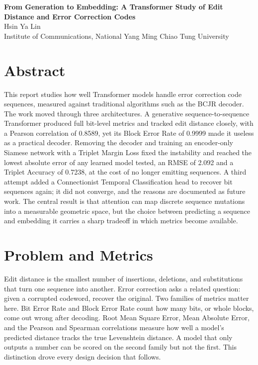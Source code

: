 \documentclass[12pt, letterpaper]{article}
\begin{document}
\begin{center}
    \textbf{From Generation to Embedding: A Transformer Study of Edit Distance and Error Correction Codes} \\
    Hsin Ya Lin \\
    Institute of Communications, National Yang Ming Chiao Tung University
\end{center}

\section*{Abstract}
This report studies how well Transformer models handle error correction code sequences, measured against traditional algorithms such as the BCJR decoder. The work moved through three architectures. A generative sequence-to-sequence Transformer produced full bit-level metrics and tracked edit distance closely, with a Pearson correlation of 0.8589, yet its Block Error Rate of 0.9999 made it useless as a practical decoder. Removing the decoder and training an encoder-only Siamese network with a Triplet Margin Loss fixed the instability and reached the lowest absolute error of any learned model tested, an RMSE of 2.092 and a Triplet Accuracy of 0.7238, at the cost of no longer emitting sequences. A third attempt added a Connectionist Temporal Classification head to recover bit sequences again; it did not converge, and the reasons are documented as future work. The central result is that attention can map discrete sequence mutations into a measurable geometric space, but the choice between predicting a sequence and embedding it carries a sharp tradeoff in which metrics become available.

\section*{Problem and Metrics}
Edit distance is the smallest number of insertions, deletions, and substitutions that turn one sequence into another. Error correction asks a related question: given a corrupted codeword, recover the original. Two families of metrics matter here. Bit Error Rate and Block Error Rate count how many bits, or whole blocks, come out wrong after decoding. Root Mean Square Error, Mean Absolute Error, and the Pearson and Spearman correlations measure how well a model's predicted distance tracks the true Levenshtein distance. A model that only outputs a number can be scored on the second family but not the first. This distinction drove every design decision that follows.
\end{document}
